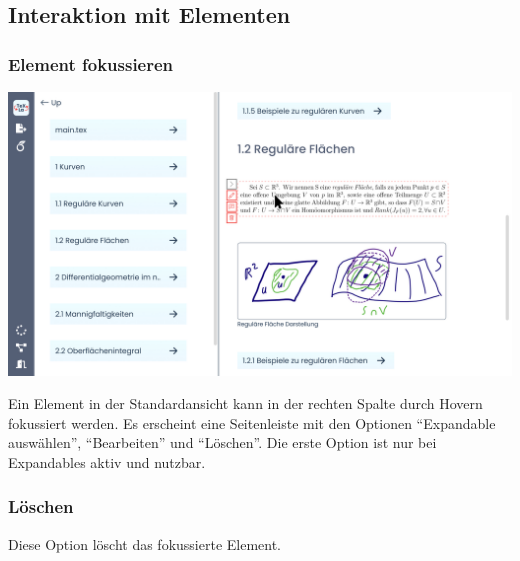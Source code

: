 \subsection{Interaktion mit Elementen}
\label{subsec:interaktion-mit-elementen}
\subsubsection{Element fokussieren}
\begin{minipage}
{\linewidth}

\includegraphics[width=\textwidth]{assets/img/Item_Selected_Hover}

\end{minipage}
Ein Element in der Standardansicht kann in der rechten Spalte durch Hovern fokussiert werden.
Es erscheint eine Seitenleiste mit den Optionen \enquote{Expandable auswählen}, \enquote{Bearbeiten} und
\enquote{Löschen}.
Die erste Option ist nur bei Expandables aktiv und nutzbar.

\subsubsection{Löschen}
Diese Option löscht das fokussierte Element.

